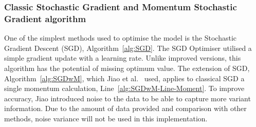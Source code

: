 \subsubsection{Classic Stochastic Gradient and Momentum Stochastic Gradient algorithm}
One of the simplest methods used to optimise the model is the Stochastic Gradient Descent (SGD), Algorithm~\ref{alg:SGD}.
The SGD Optimiser utilised a simple gradient update with a learning rate.
Unlike improved versions, this algorithm has the potential of missing optimum value.
The extension of SGD, Algorithm~\ref{alg:SGDwM}, which Jiao et al.~\cite{jiao_gru-rnn_2020} used, applies to classical SGD a single momentum calculation, Line~\ref{alg:SGDwM-Line-Moment}.
To improve accuracy, Jiao introduced noise to the data to be able to capture more variant information.
Due to the amount of data provided and comparison with other methods, noise variance will not be used in this implementation.

